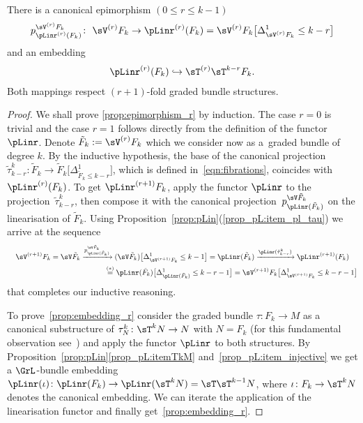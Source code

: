 \begin{Proposition}\label{prop:l_r_epi_and_inclusion} There is a canonical epimorphism $(0\leq r\leq k-1)$
\begin{gather}\label{prop:epimorphism_r}
p^{\sV^{(r)}F_k}_{\pLinr^{(r)}({F}_k)}\colon \ \sV^{(r)} F_k \rightarrow \pLinr^{(r)} (F_k) = \sV^{(r)} F_k \big[\Delta^1_{\sV^{(r)} F_k} \leq k-r\big]
\end{gather}
and an embedding
\begin{gather}\label{prop:embedding_r}
\pLinr^{(r)} (F_k) \hookrightarrow \sT^{(r)}\sT^{k-r} F_k.
\end{gather}
Both mappings respect $(r+1)$-fold graded bundle structures.
\end{Proposition}
\begin{proof} We shall prove \eqref{prop:epimorphism_r} by induction. The case $r=0$ is trivial and the case $r=1$ follows directly from the def\/inition of the functor $\pLinr$. Denote $\tilde{F}_k := \sV^{(r)} F_k$ which we consider now as a~graded bundle of degree $k$. By the inductive hypothesis, the base of the canonical projection $\tilde{\tau}^k_{k-r}\colon \tilde{F}_k\rightarrow \tilde{F}_{k}\big[\Delta^1_{\tilde{F}_k \leq k-r}\big]$, which is def\/ined in~\eqref{eqn:fibrations}, coincides with $\pLinr^{(r)}(F_k)$. To get $\pLinr^{(r+1)} F_k$, apply the functor $\pLinr$ to the projec\-tion~$\tilde{\tau}^k_{k-r}$, then compose it with the canonical projection~$p^{\sV \tilde{F}_k}_{\pLinr(\tilde{F}_k)}$ on the linearisation of $\tilde{F}_k$. Using Proposition~\ref{prop:pLin}(\ref{prop_pL:item_pl_tau}) we arrive at the sequence
\begin{gather*}
\sV^{(r+1)} F_k = \sV \tilde{F}_k \xrightarrow{p^{\sV \tilde{F}_k}_{\pLinr(\tilde{F}_k)}} (\sV \tilde{F}_k) \big[\Delta^1_{\sV^{(r+1)}F_k}\leq k-1\big] = \pLinr(\tilde{F}_k) \xrightarrow{\pLinr(\tilde{\tau}^k_{k-r})} \pLinr^{(r+1)} (F_k)  \\
\hphantom{\sV^{(r+1)} F_k = \sV \tilde{F}_k \xrightarrow{p^{\sV \tilde{F}_k}_{\pLinr(\tilde{F}_k)}}}{}
\overset{(*)}{=} \pLinr (\tilde{F}_k) \big[\Delta^1_{\pLinr (\tilde{F}_k)}\leq k-r-1\big] = \sV^{(r+1)} F_k \big[\Delta^1_{\sV^{(r+1)} F_k}\leq k-r-1\big]
\end{gather*}
that completes our inductive reasoning.

To prove~\eqref{prop:embedding_r} consider the graded bundle $\tau\colon F_k\rightarrow M$ as a canonical substructure of $\tau^k_N\colon \sT^k N\rightarrow N$ with $N=F_k$ (for this fundamental observation see~\cite{JG_MR_higher_vb})  and apply the functor $\pLinr$ to both structures. By Proposition~\ref{prop:pLin}\eqref{prop_pL:itemTkM} and~\eqref{prop_pL:item_injective} we get a $\GrL$-bundle embedding $\pLinr(\iota)\colon \pLinr(F_k) \rightarrow \pLinr(\sT^k N) = \sT \sT^{k-1} N$, where $\iota\colon F_k\rightarrow \sT^k N$ denotes the canonical embedding. We can iterate the application of the linearisation functor and f\/inally get~\eqref{prop:embedding_r}.
\end{proof}

